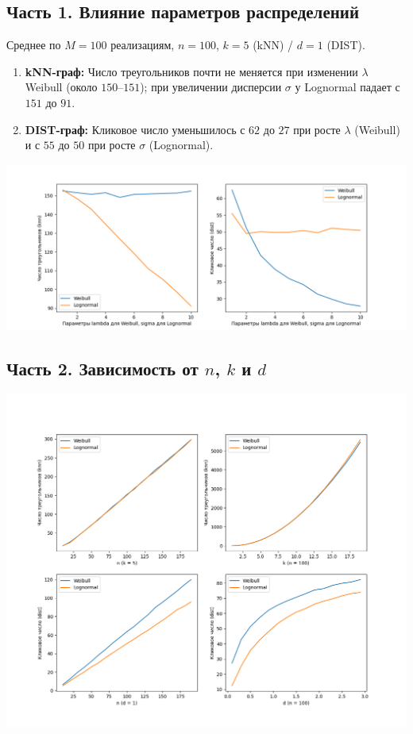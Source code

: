\documentclass[12pt,a4paper]{article}
\begin{document}
\subsection*{Часть 1. Влияние параметров распределений}
\vspace{-1em}
\noindent
Среднее по $M=100$ реализациям, $n=100$, $k=5$ (kNN) / $d=1$ (DIST).

\begin{enumerate}
  \item \textbf{kNN-граф:} Число треугольников почти не меняется при изменении $\lambda$ Weibull (около $150$–$151$); при увеличении дисперсии $\sigma$ у Lognormal падает с $151$ до $91$.
  \item \textbf{DIST-граф:} Кликовое число уменьшилось с $62$ до $27$ при росте $\lambda$ (Weibull) и с $55$ до $50$ при росте $\sigma$ (Lognormal).
\end{enumerate}

\begin{center}
  \includegraphics[width=0.9\linewidth]{part1_results_Yaroslav.png}
\end{center}

\subsection*{Часть 2. Зависимость от $n$, $k$ и $d$}
\vspace{-1em}

\begin{center}
  \includegraphics[width=0.9\linewidth]{part2_results_Yaroslav.png}
\end{center}
\end{document}
